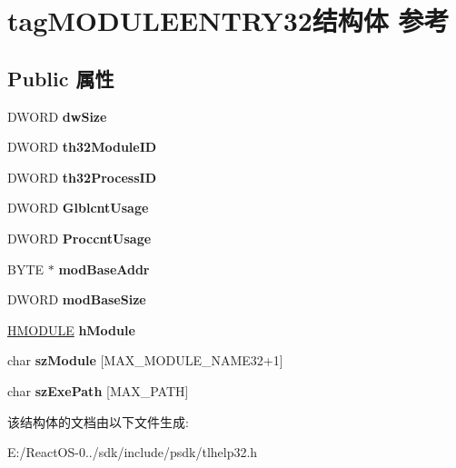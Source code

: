 \hypertarget{structtag_m_o_d_u_l_e_e_n_t_r_y32}{}\section{tag\+M\+O\+D\+U\+L\+E\+E\+N\+T\+R\+Y32结构体 参考}
\label{structtag_m_o_d_u_l_e_e_n_t_r_y32}
\subsection*{Public 属性}
\begin{DoxyCompactItemize}
\item 
\mbox{\label{structtag_m_o_d_u_l_e_e_n_t_r_y32_a4b0cec1221561db161763aa710a2ba5c}} 
D\+W\+O\+RD {\bfseries dw\+Size}
\item 
\mbox{\label{structtag_m_o_d_u_l_e_e_n_t_r_y32_a82a3c7db7b65a6978cceb3f3d8cc8640}} 
D\+W\+O\+RD {\bfseries th32\+Module\+ID}
\item 
\mbox{\label{structtag_m_o_d_u_l_e_e_n_t_r_y32_a957fed9f7803d65d9b7384b1b361a33f}} 
D\+W\+O\+RD {\bfseries th32\+Process\+ID}
\item 
\mbox{\label{structtag_m_o_d_u_l_e_e_n_t_r_y32_aa1e1d395351b47a05029ea9875f573a1}} 
D\+W\+O\+RD {\bfseries Glblcnt\+Usage}
\item 
\mbox{\label{structtag_m_o_d_u_l_e_e_n_t_r_y32_a44581d97ec149fe7aad4ce511c6b1c2d}} 
D\+W\+O\+RD {\bfseries Proccnt\+Usage}
\item 
\mbox{\label{structtag_m_o_d_u_l_e_e_n_t_r_y32_a035aac768add3d9be7a42fbf6d3a5c24}} 
B\+Y\+TE $\ast$ {\bfseries mod\+Base\+Addr}
\item 
\mbox{\label{structtag_m_o_d_u_l_e_e_n_t_r_y32_aba7d7e9c45c3d98ed946f153a7058342}} 
D\+W\+O\+RD {\bfseries mod\+Base\+Size}
\item 
\mbox{\label{structtag_m_o_d_u_l_e_e_n_t_r_y32_a1ef4ab768162c1606f40737d33ae3c7c}} 
\hyperlink{interfacevoid}{H\+M\+O\+D\+U\+LE} {\bfseries h\+Module}
\item 
\mbox{\label{structtag_m_o_d_u_l_e_e_n_t_r_y32_a59504520547260675c32b1b2112c5c58}} 
char {\bfseries sz\+Module} \mbox{[}M\+A\+X\+\_\+\+M\+O\+D\+U\+L\+E\+\_\+\+N\+A\+M\+E32+1\mbox{]}
\item 
\mbox{\label{structtag_m_o_d_u_l_e_e_n_t_r_y32_aef43ee14050459d0e512bc494695ef5c}} 
char {\bfseries sz\+Exe\+Path} \mbox{[}M\+A\+X\+\_\+\+P\+A\+TH\mbox{]}
\end{DoxyCompactItemize}


该结构体的文档由以下文件生成\+:\begin{DoxyCompactItemize}
\item 
E\+:/\+React\+O\+S-\/0../sdk/include/psdk/tlhelp32.\+h\end{DoxyCompactItemize}
